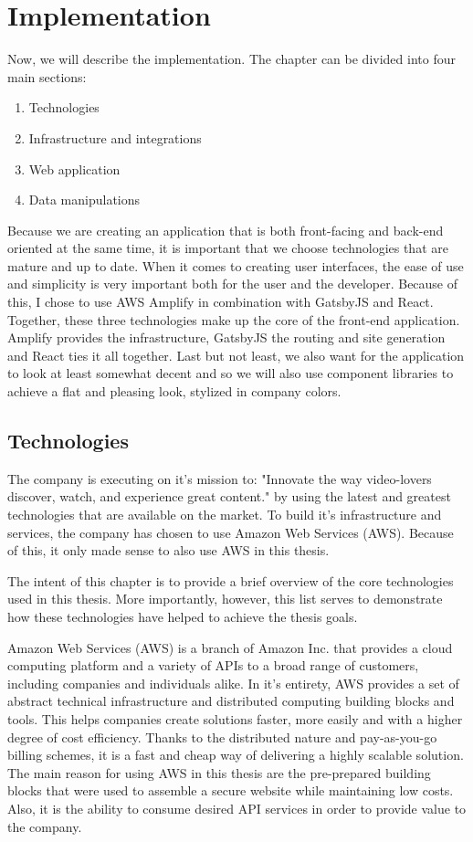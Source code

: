 \documentclass[12pt,oneside]{fithesis2}
\begin{document}
\chapter{Implementation}
Now, we will describe the implementation. The chapter can be divided into four main sections:
\begin{enumerate}
    \setlength\itemsep{0em}
    \item Technologies
    \item Infrastructure and integrations
    \item Web application
    \item Data manipulations
\end{enumerate}

Because we are creating an application that is both front-facing and back-end oriented at the same time, it is important that we choose technologies that are mature and up to date.
When it comes to creating user interfaces, the ease of use and simplicity is very important both for the user and the developer. Because of this, I chose to use AWS Amplify in combination with GatsbyJS and React. Together, these three technologies make up the core of the front-end application. Amplify provides the infrastructure, GatsbyJS the routing and site generation and React ties it all together. Last but not least, we also want for the application to look at least somewhat decent and so we will also use component libraries to achieve a flat and pleasing look, stylized in company colors.

\section{Technologies}
The company is executing on it's mission to: "Innovate the way video-lovers discover, watch, and experience great content."\cite{24iMission} by using the latest and greatest technologies that are available on the market. To build it's infrastructure and services, the company has chosen to use Amazon Web Services (AWS). Because of this, it only made sense to also use AWS in this thesis.

The intent of this chapter is to provide a brief overview of the core technologies used in this thesis. More importantly, however, this list serves to demonstrate how these technologies have helped to achieve the thesis goals.

Amazon Web Services (AWS) is a branch of Amazon Inc. that provides a cloud computing platform and a variety of APIs to a broad range of customers, including companies and individuals alike. In it's entirety, AWS provides a set of abstract technical infrastructure and distributed computing building blocks and tools. This helps companies create solutions faster, more easily and with a higher degree of cost efficiency. \cite{what-is-aws} Thanks to the distributed nature and pay-as-you-go billing schemes, it is a fast and cheap way of delivering a highly scalable solution. \cite{aws-pricing}
\newline\newline
The main reason for using AWS in this thesis are the pre-prepared building blocks that were used to assemble a secure website while maintaining low costs. Also, it is the ability to consume desired API services in order to provide value to the company.
\end{document}
